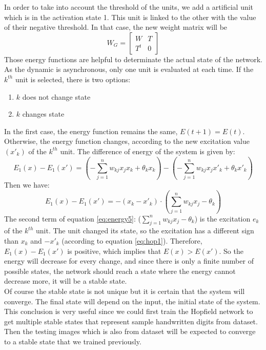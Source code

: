 In order to take into account the threshold of the units, we add a artificial unit which is in the activation state 1. This unit is linked to the other with the value of their negative threshold. In that case, the new weight matrix will be
\begin{equation}
\label{eq:energy3}
W_G = \begin{bmatrix}W & T \\T^t & 0 \end{bmatrix}
\end{equation}
Those energy functions are helpful to determinate the actual state of the network.\\

As the dynamic is asynchronous, only one unit is evaluated at each time. If the $k^{th}$ unit is selected, there is two options:

\begin{enumerate}
  \item $k$ does not change state
  \item $k$ changes state
\end{enumerate}
In the first case, the energy function remains the same, $E(t + 1) = E(t)$. Otherwise, the energy function changes, according to the new excitation value $(x'_k)$ of the $k^{th}$ unit. The difference of energy of the system is given by:
\begin{equation}
\label{eq:energy4}
E_1(x) - E_1(x') = (-\sum_{j = 1}^{n}w_{kj} x_j x_k + \theta_k x_k) - (-\sum_{j = 1}^{n} w_{kj} x_j x'_k + \theta_k x'_{k})
\end{equation}
Then we have:
\begin{equation}
\label{eq:energy5}
E_1(x) - E_1(x') = -(x_k - x'_k) \cdot (\sum_{j = 1}^{n} w_{kj}x_j - \theta_k)
\end{equation}
The second term of equation \ref{eq:energy5}: ($\sum_{j = 1}^{n} w_{kj}x_j - \theta_k$) is the excitation $e_k$ of the $k^{th}$ unit. The unit changed its state, so the excitation has a different sign than $x_k$ and $-x'_k$ (according to equation \ref{eq:hop1}). Therefore, $E_1(x) - E_1(x')$ is positive, which implies that $E(x) > E(x')$.  So the energy will decrease for every change, and since there is only a finite number of possible states, the network should reach a state where the energy cannot decrease more, it will be a stable state.\\

Of course the stable state is not unique but it is certain that the system will converge. The final state will depend on the input, the initial state of the system. This conclusion is very useful since we could first train the Hopfield network to get multiple stable states that represent sample handwritten digits from dataset. Then the testing images which is also from dataset will be expected to converge to a stable state that we trained previously. \\

